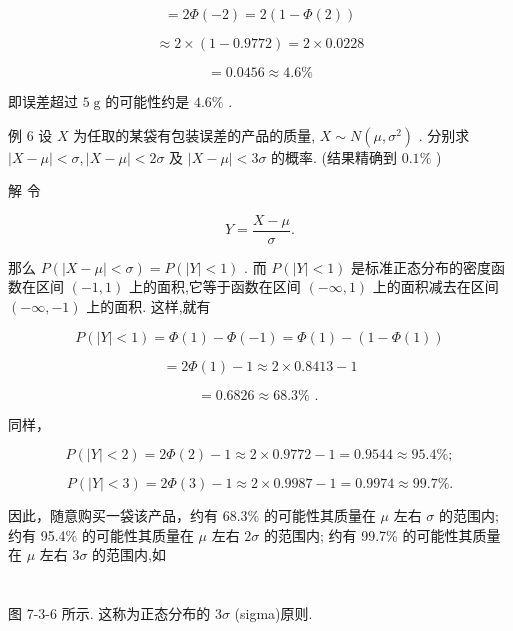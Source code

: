 \documentclass[10pt]{article}
\begin{document}
\[
= {2\Phi }\left( {-2}\right)  = 2\left( {1 - \Phi \left( 2\right) }\right)
\]

\[
\approx  2 \times  \left( {1 - {0.9772}}\right)  = 2 \times  {0.0228}
\]

\[
= {0.0456} \approx  {4.6}\%
\]

即误差超过 \(5\mathrm{\;g}\) 的可能性约是 \({4.6}\%\) .

例 6 设 \(X\) 为任取的某袋有包装误差的产品的质量, \(X \sim  N\left( {\mu ,{\sigma }^{2}}\right)\) . 分别求 \(\left| {X - \mu }\right|  < \sigma ,\left| {X - \mu }\right|  < {2\sigma }\) 及 \(\left| {X - \mu }\right|  < {3\sigma }\) 的概率. (结果精确到 \({0.1}\%\) )

解 令

\[
Y = \frac{X - \mu }{\sigma }.
\]

那么 \(P\left( {\left| {X - \mu }\right|  < \sigma }\right)  = P\left( {\left| Y\right|  < 1}\right)\) . 而 \(P\left( {\left| Y\right|  < 1}\right)\) 是标准正态分布的密度函数在区间 \(\left( {-1,1}\right)\) 上的面积,它等于函数在区间 \(\left( {-\infty ,1}\right)\) 上的面积减去在区间 \(\left( {-\infty , - 1}\right)\) 上的面积. 这样,就有

\[
P\left( {\left| Y\right|  < 1}\right)  = \Phi \left( 1\right)  - \Phi \left( {-1}\right)  = \Phi \left( 1\right)  - \left( {1 - \Phi \left( 1\right) }\right)
\]

\[
= {2\Phi }\left( 1\right)  - 1 \approx  2 \times  {0.8413} - 1
\]

\[
= {0.6826} \approx  {68.3}\% \text{ . }
\]

同样，

\[
P\left( {\left| Y\right|  < 2}\right)  = {2\Phi }\left( 2\right)  - 1 \approx  2 \times  {0.9772} - 1 = {0.9544} \approx  {95.4}\% ;
\]

\[
P\left( {\left| Y\right|  < 3}\right)  = {2\Phi }\left( 3\right)  - 1 \approx  2 \times  {0.9987} - 1 = {0.9974} \approx  {99.7}\% .
\]

因此，随意购买一袋该产品，约有 68.3\% 的可能性其质量在 \(\mu\) 左右 \(\sigma\) 的范围内; 约有 95.4\% 的可能性其质量在 \(\mu\) 左右 \({2\sigma }\) 的范围内; 约有 99.7\% 的可能性其质量在 \(\mu\) 左右 \({3\sigma }\) 的范围内,如



\section*{}

图 7-3-6 所示. 这称为正态分布的 \({3\sigma }\) (sigma)原则.
\end{document}
